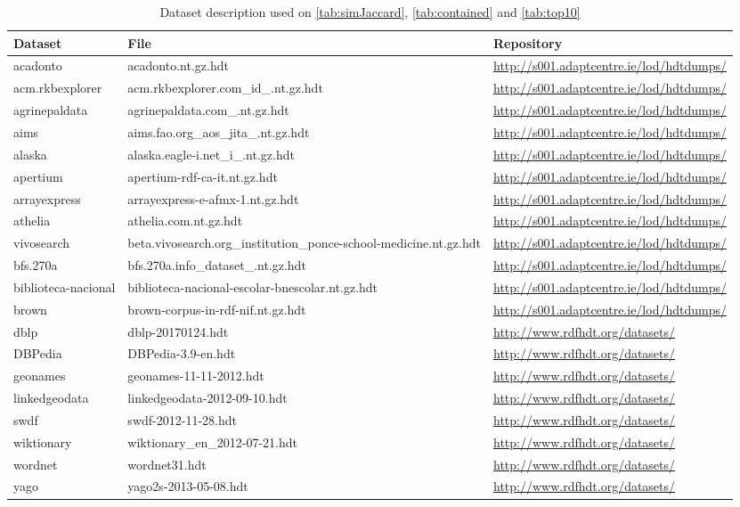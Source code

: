 \documentclass[sw]{iosart2x}
\begin{document}
\begin{table}[htb]
\begin{tabular*}{\textwidth}{@{\extracolsep{\fill}}lll}
\toprule
\textbf{Dataset} & \textbf{File} & \textbf{Repository} \\
\midrule
acadonto & acadonto.nt.gz.hdt & \url{http://s001.adaptcentre.ie/lod/hdtdumps/} \\
acm.rkbexplorer & acm.rkbexplorer.com\_id\_.nt.gz.hdt & \url{http://s001.adaptcentre.ie/lod/hdtdumps/} \\
agrinepaldata & agrinepaldata.com\_.nt.gz.hdt & \url{http://s001.adaptcentre.ie/lod/hdtdumps/} \\
aims & aims.fao.org\_aos\_jita\_.nt.gz.hdt & \url{http://s001.adaptcentre.ie/lod/hdtdumps/} \\
alaska & alaska.eagle-i.net\_i\_.nt.gz.hdt & \url{http://s001.adaptcentre.ie/lod/hdtdumps/} \\
apertium & apertium-rdf-ca-it.nt.gz.hdt & \url{http://s001.adaptcentre.ie/lod/hdtdumps/} \\
arrayexpress & arrayexpress-e-afmx-1.nt.gz.hdt & \url{http://s001.adaptcentre.ie/lod/hdtdumps/} \\
athelia & athelia.com.nt.gz.hdt & \url{http://s001.adaptcentre.ie/lod/hdtdumps/} \\
vivosearch & beta.vivosearch.org\_institution\_ponce-school-medicine.nt.gz.hdt & \url{http://s001.adaptcentre.ie/lod/hdtdumps/} \\
bfs.270a & bfs.270a.info\_dataset\_.nt.gz.hdt & \url{http://s001.adaptcentre.ie/lod/hdtdumps/} \\
biblioteca-nacional & biblioteca-nacional-escolar-bnescolar.nt.gz.hdt & \url{http://s001.adaptcentre.ie/lod/hdtdumps/} \\
brown & brown-corpus-in-rdf-nif.nt.gz.hdt & \url{http://s001.adaptcentre.ie/lod/hdtdumps/} \\
dblp & dblp-20170124.hdt & \url{http://www.rdfhdt.org/datasets/} \\
DBPedia & DBPedia-3.9-en.hdt & \url{http://www.rdfhdt.org/datasets/} \\
geonames & geonames-11-11-2012.hdt & \url{http://www.rdfhdt.org/datasets/} \\
linkedgeodata & linkedgeodata-2012-09-10.hdt & \url{http://www.rdfhdt.org/datasets/} \\
swdf & swdf-2012-11-28.hdt & \url{http://www.rdfhdt.org/datasets/} \\
wiktionary & wiktionary\_en\_2012-07-21.hdt & \url{http://www.rdfhdt.org/datasets/} \\
wordnet & wordnet31.hdt & \url{http://www.rdfhdt.org/datasets/} \\
yago & yago2s-2013-05-08.hdt & \url{http://www.rdfhdt.org/datasets/} \\
\bottomrule
\end{tabular*}
\caption{Dataset description used on \cref{tab:simJaccard}, \cref{tab:contained} and \cref{tab:top10}}
\label{tab:dsDesc}
\end{table}
\end{document}
